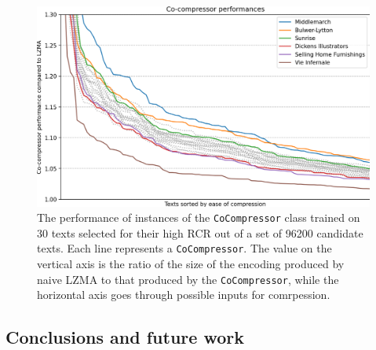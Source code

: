 \begin{figure}[h!]
\centering
\includegraphics[width=\textwidth]{img/fig_cocomp_performance_best.png}
\caption{The performance of instances of the \texttt{CoCompressor} class trained on 30 texts selected for their high RCR out of a set of 96200 candidate texts. Each line represents a \texttt{CoCompressor}. The value on the vertical axis is the ratio of the size of the encoding produced by naive LZMA to that produced by the \texttt{CoCompressor}, while the horizontal axis goes through possible inputs for comrpession.}
\label{fig:cocomp_comparison_best}
\end{figure}








\subsection{Conclusions and future work}

